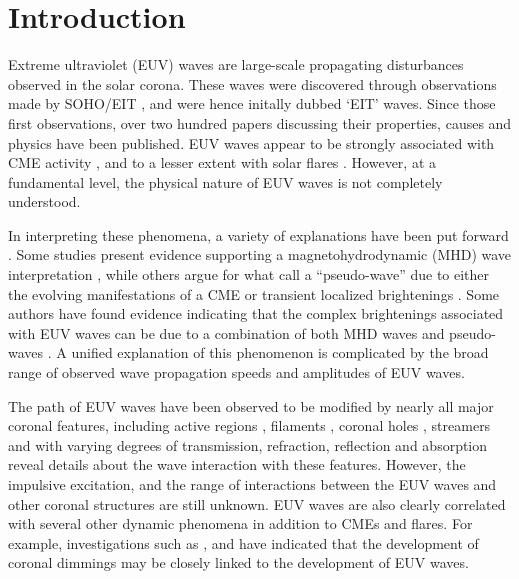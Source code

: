 \section{Introduction}\label{sec:Intro}

Extreme ultraviolet (EUV) waves are large-scale propagating
disturbances observed in the solar corona. These waves were discovered
through observations made by SOHO/EIT \citep{1997SoPh..175..571M,
  1998GeoRL..25.2465T, 1999ApJ...517L.151T}, and were hence initally
dubbed `EIT' waves. Since those first observations, over two hundred
papers discussing their properties, causes and physics have been
published. EUV waves appear to be strongly associated with CME
activity \cite{2002ApJ...569.1009B}, and to a lesser extent with solar
flares \citep{2006ApJ...641L.153}. However, at a fundamental level, the
physical nature of EUV waves is not completely understood.

In interpreting these phenomena, a variety of explanations have been put forward \citep[see][for a
review of current interpretations of EUV waves]{2011SSRv..158..365G}. Some studies present evidence
supporting a magnetohydrodynamic (MHD) wave interpretation
\citep{1998GeoRL..25.2465T, 1999ApJ...517L.151T,2000ApJ...543L..89W,
  2001JGR...10625089W, 2002ApJ...574..440O, 2010ApJ...713.1008S},
while others argue for what \cite{2012SoPh..281..187P} call a “pseudo-wave”
due to either the evolving manifestations of a CME
\citep{1999SoPh..190..107D, 2000ApJ...545..512D, 2008SoPh..247..123D,
  2011ApJ...738..167S} or transient localized brightenings
\citep{2007ApJ...656L.101A, 2007AN....328..760A}.  Some authors have
found evidence indicating that the complex brightenings associated
with EUV waves can be due to a combination of both MHD waves and
pseudo-waves \citep{2002ApJ...572L..99C, 2005ApJ...622.1202C,
  2004A&A...427..705Z, 2009ApJ...705..587C}. A unified explanation of this phenomenon is complicated by the broad range of observed wave propagation speeds \citep{2011A&A...532A.151W} and amplitudes of EUV waves. 

The path of EUV waves have been observed to be modified by nearly all
major coronal features, including active regions
\citep{2000ApJ...543L..89W}, filaments \citep{2012ApJ...753...52L},
coronal holes \citep{2009ApJ...691L.123G}, streamers
\citep{2013ApJ...766...55K} and with varying degrees of transmission,
refraction, reflection and absorption reveal details about the wave
interaction with these features. However, the impulsive excitation,
and the range of interactions between the EUV waves and other coronal
structures are still unknown. EUV waves are also clearly correlated with several other dynamic phenomena in addition to CMEs
and flares. For example, investigations such as
\cite{2000SoPh..193..161T}, \cite{2004A&A...427..705Z} and
\cite{2010ApJ...709..369P} have indicated that the development of
coronal dimmings may be closely linked to the development of EUV
waves.

